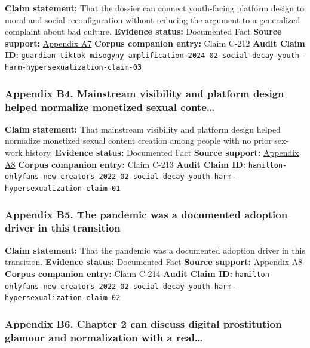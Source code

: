 \documentclass[
  american,
  11pt,
  letterpaper,
]{article}
\begin{document}
\textbf{Claim statement:} That the dossier can connect youth-facing
platform design to moral and social reconfiguration without reducing the
argument to a generalized complaint about bad culture. \textbf{Evidence
status:} Documented Fact \textbf{Source support:}
\hyperref[ch-02-appendix-a7-social-media-algorithms-amplifying-misogynistic-content]{Appendix
A7} \textbf{Corpus companion entry:} Claim C-212 \textbf{Audit Claim
ID:}
\texttt{guardian-tiktok-misogyny-amplification-2024-02-social-decay-youth-harm-hypersexualization-claim-03}

\subsubsection{Appendix B4. Mainstream visibility and platform design
helped normalize monetized sexual
conte\ldots{}}\label{ch-02-appendix-b4-mainstream-visibility-and-platform-design-helped-normalize-monetized-sexual-conte}

\textbf{Claim statement:} That mainstream visibility and platform design
helped normalize monetized sexual content creation among people with no
prior sex-work history. \textbf{Evidence status:} Documented Fact
\textbf{Source support:}
\hyperref[ch-02-appendix-a8-nudes-shouldn-t-i-charge-for-these-motivations-of-new-sexual-content-creators-on-onlyfans]{Appendix
A8} \textbf{Corpus companion entry:} Claim C-213 \textbf{Audit Claim
ID:}
\texttt{hamilton-onlyfans-new-creators-2022-02-social-decay-youth-harm-hypersexualization-claim-01}

\subsubsection{Appendix B5. The pandemic was a documented adoption
driver in this
transition}\label{ch-02-appendix-b5-the-pandemic-was-a-documented-adoption-driver-in-this-transition}

\textbf{Claim statement:} That the pandemic was a documented adoption
driver in this transition. \textbf{Evidence status:} Documented Fact
\textbf{Source support:}
\hyperref[ch-02-appendix-a8-nudes-shouldn-t-i-charge-for-these-motivations-of-new-sexual-content-creators-on-onlyfans]{Appendix
A8} \textbf{Corpus companion entry:} Claim C-214 \textbf{Audit Claim
ID:}
\texttt{hamilton-onlyfans-new-creators-2022-02-social-decay-youth-harm-hypersexualization-claim-02}

\subsubsection{Appendix B6. Chapter 2 can discuss digital prostitution
glamour and normalization with a
real\ldots{}}\label{ch-02-appendix-b6-chapter-2-can-discuss-digital-prostitution-glamour-and-normalization-with-a-real}
\end{document}
